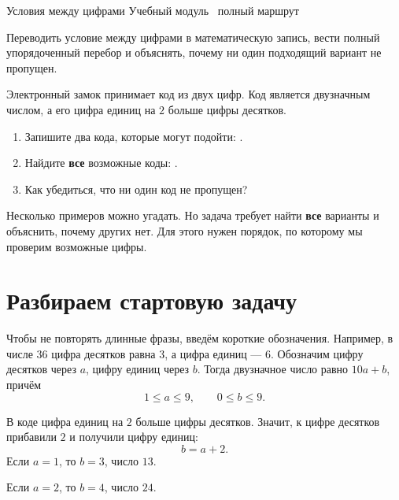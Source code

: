 \worksheettitle
  {Условия между цифрами}
  { Учебный модуль \textbullet\ полный маршрут}

\studentnameblock

\begin{notebox}
  Переводить условие между цифрами в математическую запись, вести полный
  упорядоченный перебор и объяснять, почему ни один подходящий вариант не
  пропущен.
\end{notebox}

\begin{practicebox}
  Электронный замок принимает код из двух цифр. Код является двузначным
  числом, а его цифра единиц на \(2\) больше цифры десятков.
  \begin{enumerate}[label=\textbf{\arabic*.}]
    \item Запишите два кода, которые могут подойти: \answerblank[45mm].
    \item Найдите \textbf{все} возможные коды: \answerblank[70mm].
    \item Как убедиться, что ни один код не пропущен? 
  \end{enumerate}
\end{practicebox}

\begin{reflectionbox}
  Несколько примеров можно угадать. Но задача требует найти \textbf{все}
  варианты и объяснить, почему других нет. Для этого нужен порядок, по
  которому мы проверим возможные цифры.
\end{reflectionbox}



\section{Разбираем стартовую задачу}

Чтобы не повторять длинные фразы, введём короткие обозначения. Например, в
числе \(36\) цифра десятков равна \(3\), а цифра единиц --- \(6\). Обозначим
цифру десятков через \(a\), цифру единиц через \(b\). Тогда двузначное число
равно \(10a+b\), причём
\[
  1\leq a\leq9, \qquad 0\leq b\leq9.
\]

\begin{fillbox}
  В коде цифра единиц на \(2\) больше цифры десятков. Значит, к цифре
  десятков прибавили \(2\) и получили цифру единиц:
  \[
    b=a+2.
  \]
  Если \(a=1\), то \(b=3\), число \(13\).

  Если \(a=2\), то \(b=4\), число \(24\).
\end{fillbox}

